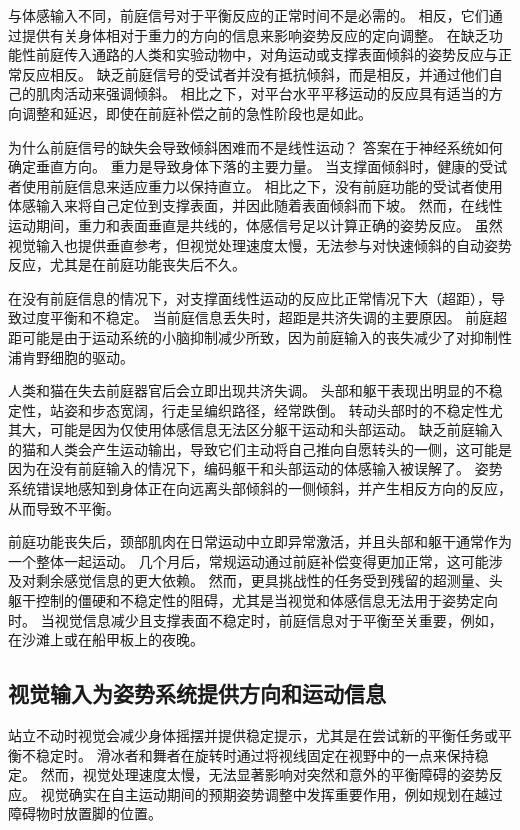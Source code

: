与体感输入不同，前庭信号对于平衡反应的正常时间不是必需的。
相反，它们通过提供有关身体相对于重力的方向的信息来影响姿势反应的定向调整。
在缺乏功能性前庭传入通路的人类和实验动物中，对角运动或支撑表面倾斜的姿势反应与正常反应相反。
缺乏前庭信号的受试者并没有抵抗倾斜，而是相反，并通过他们自己的肌肉活动来强调倾斜。
相比之下，对平台水平平移运动的反应具有适当的方向调整和延迟，即使在前庭补偿之前的急性阶段也是如此。


为什么前庭信号的缺失会导致倾斜困难而不是线性运动？
答案在于神经系统如何确定垂直方向。
重力是导致身体下落的主要力量。
当支撑面倾斜时，健康的受试者使用前庭信息来适应重力以保持直立。
相比之下，没有前庭功能的受试者使用体感输入来将自己定位到支撑表面，并因此随着表面倾斜而下坡。
然而，在线性运动期间，重力和表面垂直是共线的，体感信号足以计算正确的姿势反应。
虽然视觉输入也提供垂直参考，但视觉处理速度太慢，无法参与对快速倾斜的自动姿势反应，尤其是在前庭功能丧失后不久。


在没有前庭信息的情况下，对支撑面线性运动的反应比正常情况下大（超距），导致过度平衡和不稳定。
当前庭信息丢失时，超距是共济失调的主要原因。
前庭超距可能是由于运动系统的小脑抑制减少所致，因为前庭输入的丧失减少了对抑制性浦肯野细胞的驱动。


人类和猫在失去前庭器官后会立即出现共济失调。
头部和躯干表现出明显的不稳定性，站姿和步态宽阔，行走呈编织路径，经常跌倒。
转动头部时的不稳定性尤其大，可能是因为仅使用体感信息无法区分躯干运动和头部运动。
缺乏前庭输入的猫和人类会产生运动输出，导致它们主动将自己推向自愿转头的一侧，这可能是因为在没有前庭输入的情况下，编码躯干和头部运动的体感输入被误解了。
姿势系统错误地感知到身体正在向远离头部倾斜的一侧倾斜，并产生相反方向的反应，从而导致不平衡。


前庭功能丧失后，颈部肌肉在日常运动中立即异常激活，并且头部和躯干通常作为一个整体一起运动。
几个月后，常规运动通过前庭补偿变得更加正常，这可能涉及对剩余感觉信息的更大依赖。
然而，更具挑战性的任务受到残留的超测量、头躯干控制的僵硬和不稳定性的阻碍，尤其是当视觉和体感信息无法用于姿势定向时。
当视觉信息减少且支撑表面不稳定时，前庭信息对于平衡至关重要，例如，在沙滩上或在船甲板上的夜晚。



\subsection{视觉输入为姿势系统提供方向和运动信息}

站立不动时视觉会减少身体摇摆并提供稳定提示，尤其是在尝试新的平衡任务或平衡不稳定时。
滑冰者和舞者在旋转时通过将视线固定在视野中的一点来保持稳定。
然而，视觉处理速度太慢，无法显著影响对突然和意外的平衡障碍的姿势反应。
视觉确实在自主运动期间的预期姿势调整中发挥重要作用，例如规划在越过障碍物时放置脚的位置。


